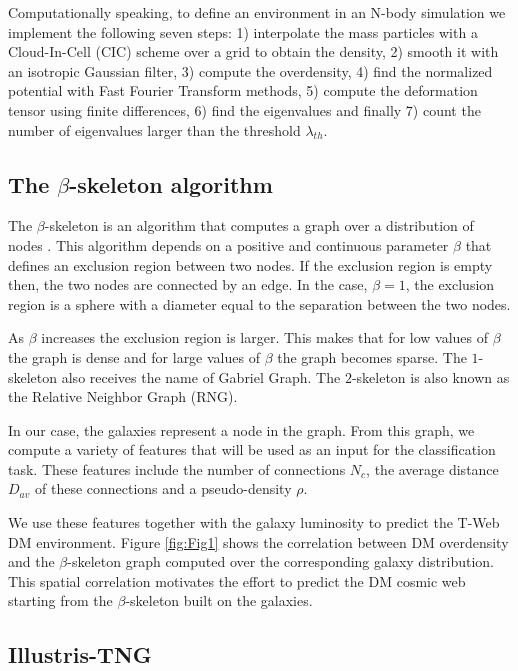 \documentclass[usenatbib]{mnras}
\begin{document}
Computationally speaking, to define an environment in an N-body simulation 
we implement the following seven steps: 1) interpolate the mass particles with a Cloud-In-Cell
(CIC) scheme over a grid to obtain the density, 2) smooth it with an isotropic Gaussian filter,
3) compute the overdensity, 4) find the normalized potential with Fast Fourier Transform
methods, 5) compute the deformation tensor using finite differences, 6) find the eigenvalues and
finally 7) count the number of eigenvalues larger than the threshold $\lambda_{th}$.

\subsection{The $\beta$-skeleton algorithm}
The $\beta$-skeleton is an algorithm that computes a graph over a distribution of nodes
\citep{Kirkpatrick1985, Fang2019}. 
This algorithm depends on a positive and continuous parameter $\beta$ that defines an exclusion
region between two nodes.
If the exclusion region is empty then, the two nodes are connected by an edge. 
In the case, $\beta=1$, the exclusion region is a sphere with a diameter equal to the separation
between the two nodes. 

As $\beta$ increases the exclusion region is larger.
This makes that for low values of $\beta$ the graph is dense and for large values of $\beta$
the graph becomes sparse.
The $1$-skeleton also receives the name of Gabriel Graph. 
The $2$-skeleton is also known as the Relative Neighbor Graph (RNG).

In our case, the galaxies represent a node in the graph.
From this graph, we compute a variety of features that will be used as an input
for the classification task.
These features include the number of connections $N_{c}$, the average distance $D_{av}$ of these connections and a pseudo-density $\rho$.

We use these features together with the galaxy luminosity to predict the T-Web DM environment.
Figure \ref{fig:Fig1} shows the correlation between DM overdensity and the $\beta$-skeleton 
graph computed over the corresponding galaxy distribution.
This spatial correlation motivates the effort to predict the DM cosmic web starting from
the $\beta$-skeleton built on the galaxies.

\subsection{Illustris-TNG}
\end{document}

